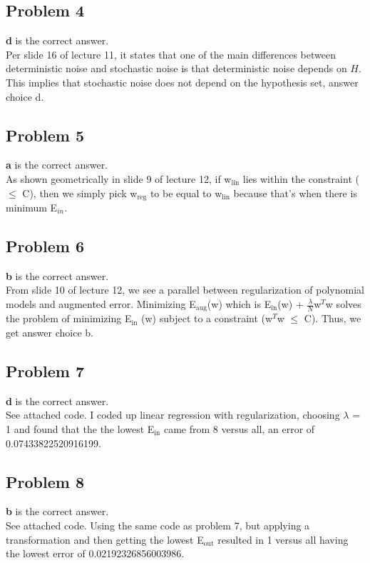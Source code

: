 \documentclass[12 pt]{article}
\begin{document}
	\subsection*{Problem 4}
	\textbf{d} is the correct answer.\\
	Per slide 16 of lecture 11, it states that one of the main differences between deterministic noise and stochastic noise is that deterministic noise depends on $H$. This implies that stochastic noise does not depend on the hypothesis set, answer choice d.

	\subsection*{Problem 5}
	\textbf{a} is the correct answer.\\
	As shown geometrically in slide 9 of lecture 12, if w$_{\text{lin}}$ lies within the constraint ($\leq$ C), then we simply pick w$_{\text{reg}}$ to be equal to w$_{\text{lin}}$ because that's when there is minimum E$_{in}$.
		
	\subsection*{Problem 6}
	\textbf{b} is the correct answer. \\
	From slide 10 of lecture 12, we see a parallel between regularization of polynomial models and augmented error. Minimizing E$_{\text{aug}}$(w) which is E$_{\text{in}}$(w) + $\frac{\lambda}{N}$w$^T$w solves the problem of minimizing E$_{\text{in}}$ (w) subject to a constraint (w$^T$w $\leq$ C). Thus, we get answer choice b.
	
	\subsection*{Problem 7}
	\textbf{d} is the correct answer. \\
	See attached code. I coded up linear regression with regularization, choosing $\lambda$ = 1 and found that the the lowest E$_{\text{in}}$ came from 8 versus all, an error of 0.07433822520916199.
		
	
	\subsection*{Problem 8}
	\textbf{b} is the correct answer. \\
	See attached code. Using the same code as problem 7, but applying a transformation and then getting the lowest  E$_{\text{out}}$ resulted in 1 versus all having the lowest error of 0.02192326856003986.
\end{document}
